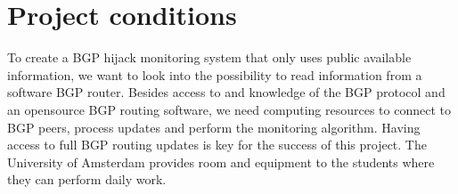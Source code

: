 \section{Project conditions}
To create a BGP hijack monitoring system that only uses public available information, we want to look into the possibility to read information from a software BGP router. Besides access to and knowledge of the BGP protocol and an opensource BGP routing software, we need computing resources to connect to BGP peers, process updates and perform the monitoring algorithm. Having access to full BGP routing updates is key for the success of this project. The University of Amsterdam provides room and equipment to the students where they can perform daily work.

